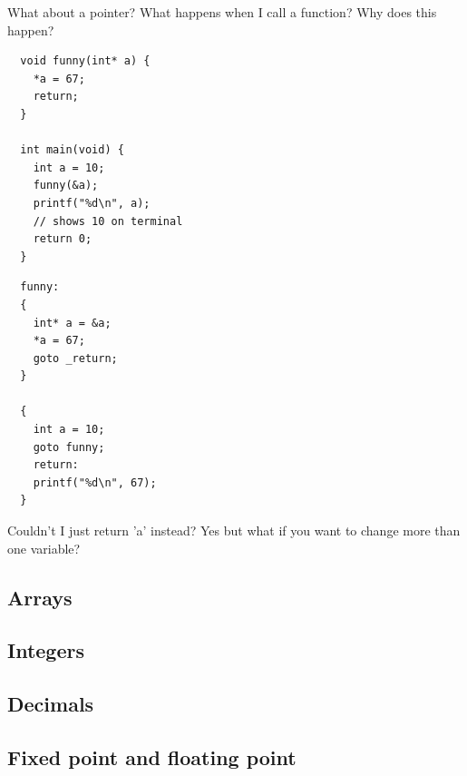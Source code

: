 What about a pointer?
What happens when I call a function? Why does this happen?
\begin{verbatim}
  void funny(int* a) {
    *a = 67;
    return;
  }

  int main(void) {
    int a = 10;
    funny(&a);
    printf("%d\n", a);
    // shows 10 on terminal
    return 0;
  }
\end{verbatim}
\begin{verbatim}
  funny:
  {
    int* a = &a;
    *a = 67;
    goto _return;
  }

  {
    int a = 10;
    goto funny;
    return:
    printf("%d\n", 67);
  }
\end{verbatim}

Couldn't I just return 'a' instead? Yes but what if you want to change more than one variable?


\subsection{Arrays}
\subsection{Integers}
\subsection{Decimals}
\subsection{Fixed point and floating point}
